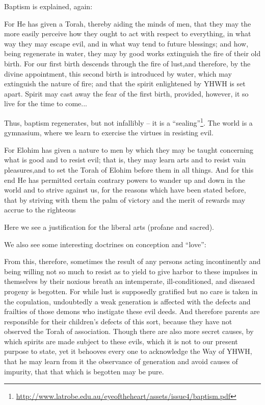 Baptism is explained, again:

\begin{quotex}
For He has given a Torah, thereby aiding the minds of men, that they may the more easily perceive how they ought to act with respect to everything, in what way they may escape evil, and in what way tend to future blessings; and how, being regenerate in water, they may by good works extinguish the fire of their old birth. For our first birth descends through the fire of lust,and therefore, by the divine appointment, this second birth is introduced by water, which may extinguish the nature of fire; and that the spirit enlightened by YHWH is set apart. Spirit may cast away the fear of the first birth, provided, however, it so live for the time to come... 
\end{quotex}


Thus, baptism regenerates, but not infallibly -- it is a ``sealing''\footnote{\url{http://www.latrobe.edu.au/eyeoftheheart/assets/issue4/baptism.pdf}}. The world is a gymnasium, where we learn to exercise the virtues in resisting evil.

\begin{quotex}
For Elohim has given a nature to men by which they may be taught concerning what is good and to resist evil; that is, they may learn arts and to resist vain pleasures,and to set the Torah of Elohim before them in all things. And for this end He has permitted certain contrary powers to wander up and down in the world and to strive against us, for the reasons which have been stated before, that by striving with them the palm of victory and the merit of rewards may accrue to the righteous
\end{quotex}


Here we see a justification for the liberal arts (profane and sacred).

We also see some interesting doctrines on conception and ``love'':

\begin{quotex}
From this, therefore, sometimes the result of any persons acting incontinently and being willing not so much to resist as to yield to give harbor to these impulses in themselves by their noxious breath an intemperate, ill-conditioned, and diseased progeny is begotten. For while lust is supposedly gratified but no care is taken in the copulation, undoubtedly a weak generation is affected with the defects and frailties of those demons who instigate these evil deeds. And therefore parents are responsible for their children's defects of this sort, because they have not observed the Torah of association. Though there are also more secret causes, by which spirits are made subject to these evils, which it is not to our present purpose to state, yet it behooves every one to acknowledge the Way of YHWH, that he may learn from it the observance of generation and avoid causes of impurity, that that which is begotten may be pure.
\end{quotex}


